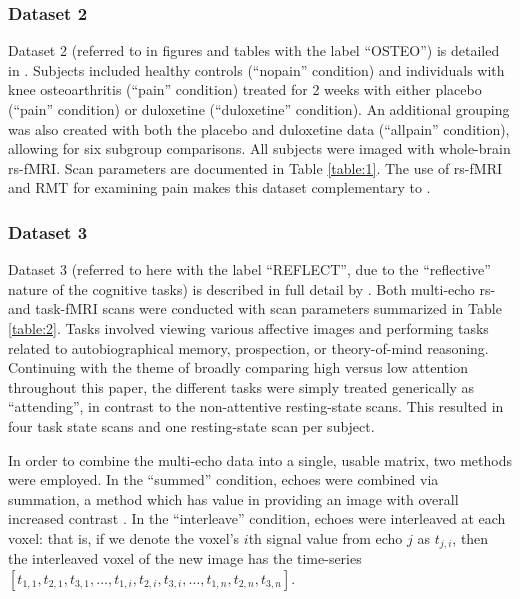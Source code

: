 \documentclass[NETN,manuscript]{stjour-new}
\begin{document}
\subsubsection{Dataset 2}
Dataset 2 (referred to in figures and tables with the label ``OSTEO'') is detailed in
\cite{tetreaultBrainConnectivityPredicts2016}. Subjects included healthy controls (``nopain''
condition) and individuals with knee osteoarthritis (``pain'' condition) treated for 2 weeks with
either placebo (``pain'' condition) or duloxetine (``duloxetine'' condition). An additional grouping was
also created with both the placebo and duloxetine data (``allpain'' condition), allowing for six
subgroup comparisons. All subjects were imaged with whole-brain rs-fMRI. Scan parameters are
documented in Table \ref{table:1}. The use of rs-fMRI and RMT for examining pain makes this dataset
complementary to \cite{matharooSpontaneousBackpainAlters2020}.

\subsubsection{Dataset 3}
Dataset 3  (referred to here with the label ``REFLECT'', due to the ``reflective” nature of the
cognitive tasks) is described in full detail by \cite{dupreMultiechoFMRIReplication2016}. Both
multi-echo rs- and task-fMRI scans were conducted with scan parameters summarized in Table \ref{table:2}. Tasks
involved viewing various affective images \citep[see][for details]{sprengPatternsBrainActivity2010}
and performing tasks related to autobiographical memory, prospection, or theory-of-mind reasoning.
Continuing with the theme of broadly comparing high versus low attention throughout this paper, the
different tasks were simply treated generically as ``attending'', in contrast to the non-attentive
resting-state scans. This resulted in four task state scans and one resting-state scan per subject.

In order to combine the multi-echo data into a single, usable matrix, two methods were employed. In
the ``summed'' condition, echoes were combined via summation, a method which has value in providing an
image with overall increased contrast \citep{kunduMultiechoFMRIReview2017}. In the ``interleave''
condition, echoes were interleaved at each voxel: that is, if we denote the voxel's \(i\)th signal value
from echo \(j\) as \(t_{j,i}\), then the interleaved voxel of the new image has the time-series \([t_{1,1},
t_{2,1}, t_{3,1}, \dots, t_{1,i}, t_{2,i}, t_{3,i}, \dots, t_{1,n}, t_{2,n}, t_{3,n}]\).
\end{document}

